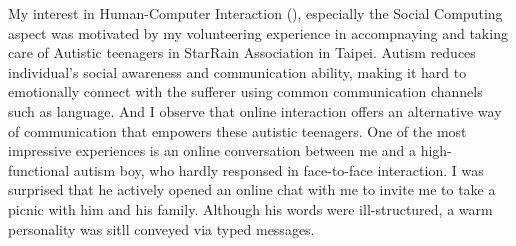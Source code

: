 %

\noindent
My interest in Human-Computer Interaction (), especially the Social Computing aspect 
was motivated by my volunteering experience in accompnaying and taking care of Autistic teenagers in StarRain Association in Taipei. 
Autism reduces individual's social awareness and communication ability, 
making it hard to emotionally connect with the sufferer using common communication channels such as language. 
And I observe that online interaction offers an alternative way of communication that empowers these autistic teenagers. 
One of the most impressive experiences is an online conversation between me and a high-functional autism boy, 
who hardly responsed in face-to-face interaction. 
I was surprised that he actively opened an online chat with me to invite me to take a picnic with him and his family. 
Although his words were ill-structured, a warm personality was sitll conveyed via typed messages.\\ 

